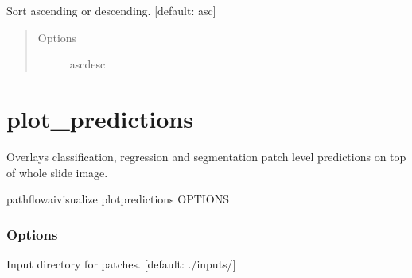 \documentclass[letterpaper,10pt,english]{sphinxmanual}
\begin{document}
\begin{fulllineitems}
\label{\detokenize{index:cmdoption-pathflowai-visualize-plot-image-umap-embeddings-sm}}
Sort ascending or descending.  {[}default: asc{]}
\begin{quote}\begin{description}
\item[{Options}] \leavevmode
asc\textbar{}desc

\end{description}\end{quote}

\end{fulllineitems}



\section{plot\_predictions}
\label{\detokenize{index:pathflowai-visualize-plot-predictions}}
Overlays classification, regression and segmentation patch level predictions on top of whole slide image.

\begin{sphinxVerbatim}[commandchars=\\\{\}]
pathflowai\PYGZhy{}visualize plot\PYGZus{}predictions \PYG{o}{[}OPTIONS\PYG{o}{]}
\end{sphinxVerbatim}
\subsubsection*{Options}

\begin{fulllineitems}
\label{\detokenize{index:cmdoption-pathflowai-visualize-plot-predictions-i}}
Input directory for patches.  {[}default: ./inputs/{]}

\end{fulllineitems}
\end{document}
